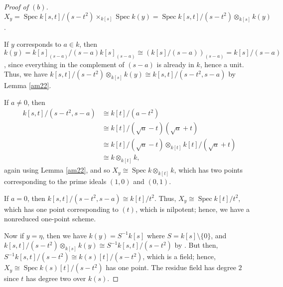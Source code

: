 \documentclass[12pt,letterpaper]{article}
\theoremstyle{definition}
\theoremstyle{remark}
\numberwithin{equation}{section}
\numberwithin{figure}{problem}
\DeclareMathOperator{\Spec}{Spec}
\begin{document}
\begin{proof}[Proof of $(b)$]
  $X_y = \Spec k[s,t]/(s-t^2) \times_{k[s]} \Spec k(y) = \Spec k[s,t]/(s-t^2) \otimes_{k[s]} k(y)$.
  \par If $y$ corresponds to $a \in k$, then $k(y) = k[s]_{(s-a)}/(s-a)k[s]_{(s-a)} \cong (k[s]/(s-a))_{(s-a)} = k[s]/(s-a)$, since everything in the complement of $(s-a)$ is already in $k$, hence a unit. Thus, we have $k[s,t]/(s-t^2) \otimes_{k[s]} k(y) \cong k[s,t]/(s-t^2,s-a)$ by Lemma \ref{am22}.
  \par If $a \ne 0$, then
  \begin{align*}
    k[s,t]/(s-t^2,s-a) &\cong k[t]/(a-t^2)\\
    &\cong k[t]/(\sqrt{a}-t)(\sqrt{a}+t)\\
    &\cong k[t]/(\sqrt{a}-t) \otimes_{k[t]} k[t]/(\sqrt{a}+t)\\
    &\cong k \otimes_{k[t]} k,
  \end{align*}
  again using Lemma \ref{am22}, and so $X_y \cong \Spec k \otimes_{k[t]} k$, which has two points corresponding to the prime ideals $(1,0)$ and $(0,1)$.
  \par If $a = 0$, then $k[s,t]/(s-t^2,s-a) \cong k[t]/t^2$. Thus, $X_y \cong \Spec k[t]/t^2$, which has one point corresponding to $(t)$, which is nilpotent; hence, we have a nonreduced one-point scheme.
  \par Now if $y = \eta$, then we have $k(y) = S^{-1}k[s]$ where $S = k[s] \setminus \{0\}$, and $k[s,t]/(s-t^2) \otimes_{k[s]} k(y) \cong S^{-1}k[s,t]/(s-t^2)$ by \cite[Prop.~3.5]{AM69}. But then, $S^{-1}k[s,t]/(s-t^2) \cong k(s)[t]/(s-t^2)$, which is a field; hence, $X_y \cong \Spec k(s)[t]/(s-t^2)$ has one point. The residue field has degree $2$ since $t$ has degree two over $k(s)$.
\end{proof}
\end{document}
